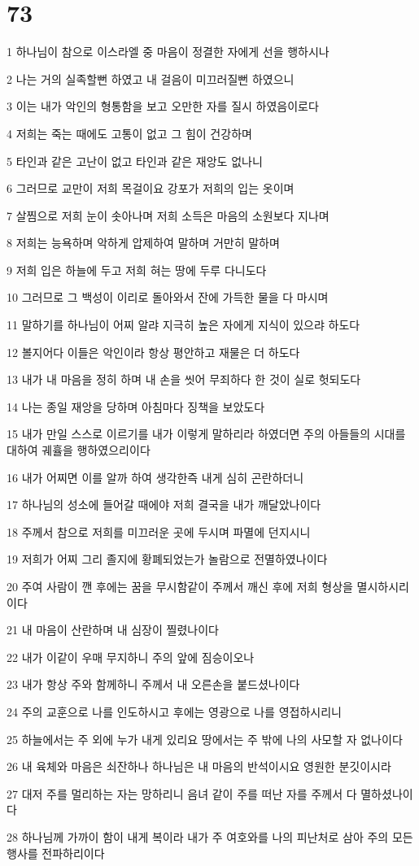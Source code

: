 \chapter{73}

\par 1 하나님이 참으로 이스라엘 중 마음이 정결한 자에게 선을 행하시나
\par 2 나는 거의 실족할뻔 하였고 내 걸음이 미끄러질뻔 하였으니
\par 3 이는 내가 악인의 형통함을 보고 오만한 자를 질시 하였음이로다
\par 4 저희는 죽는 때에도 고통이 없고 그 힘이 건강하며
\par 5 타인과 같은 고난이 없고 타인과 같은 재앙도 없나니
\par 6 그러므로 교만이 저희 목걸이요 강포가 저희의 입는 옷이며
\par 7 살찜으로 저희 눈이 솟아나며 저희 소득은 마음의 소원보다 지나며
\par 8 저희는 능욕하며 악하게 압제하여 말하며 거만히 말하며
\par 9 저희 입은 하늘에 두고 저희 혀는 땅에 두루 다니도다
\par 10 그러므로 그 백성이 이리로 돌아와서 잔에 가득한 물을 다 마시며
\par 11 말하기를 하나님이 어찌 알랴 지극히 높은 자에게 지식이 있으랴 하도다
\par 12 볼지어다 이들은 악인이라 항상 평안하고 재물은 더 하도다
\par 13 내가 내 마음을 정히 하며 내 손을 씻어 무죄하다 한 것이 실로 헛되도다
\par 14 나는 종일 재앙을 당하며 아침마다 징책을 보았도다
\par 15 내가 만일 스스로 이르기를 내가 이렇게 말하리라 하였더면 주의 아들들의 시대를 대하여 궤휼을 행하였으리이다
\par 16 내가 어찌면 이를 알까 하여 생각한즉 내게 심히 곤란하더니
\par 17 하나님의 성소에 들어갈 때에야 저희 결국을 내가 깨달았나이다
\par 18 주께서 참으로 저희를 미끄러운 곳에 두시며 파멸에 던지시니
\par 19 저희가 어찌 그리 졸지에 황폐되었는가 놀람으로 전멸하였나이다
\par 20 주여 사람이 깬 후에는 꿈을 무시함같이 주께서 깨신 후에 저희 형상을 멸시하시리이다
\par 21 내 마음이 산란하며 내 심장이 찔렸나이다
\par 22 내가 이같이 우매 무지하니 주의 앞에 짐승이오나
\par 23 내가 항상 주와 함께하니 주께서 내 오른손을 붙드셨나이다
\par 24 주의 교훈으로 나를 인도하시고 후에는 영광으로 나를 영접하시리니
\par 25 하늘에서는 주 외에 누가 내게 있리요 땅에서는 주 밖에 나의 사모할 자 없나이다
\par 26 내 육체와 마음은 쇠잔하나 하나님은 내 마음의 반석이시요 영원한 분깃이시라
\par 27 대저 주를 멀리하는 자는 망하리니 음녀 같이 주를 떠난 자를 주께서 다 멸하셨나이다
\par 28 하나님께 가까이 함이 내게 복이라 내가 주 여호와를 나의 피난처로 삼아 주의 모든 행사를 전파하리이다

